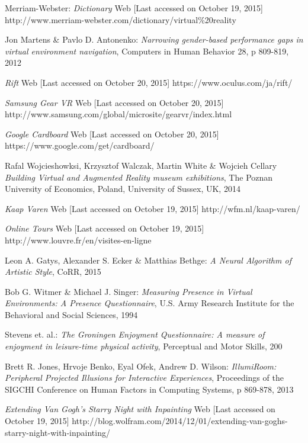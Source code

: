 \documentclass[a4paper]{article}
\begin{document}
\begin{thebibliography}{99}

 Merriam-Webster:
\emph{Dictionary}
Web [Last accessed on October 19, 2015]
http://www.merriam-webster.com/dictionary/virtual\%20reality

 Jon Martens \& Pavlo D. Antonenko:
\emph{Narrowing gender-based performance gaps in virtual environment navigation},
Computers in Human Behavior 28, p 809-819, 2012

\emph{Rift}
Web [Last accessed on October 20, 2015]
https://www.oculus.com/ja/rift/

\emph{Samsung Gear VR}
Web [Last accessed on October 20, 2015]
http://www.samsung.com/global/microsite/gearvr/index.html

\emph{Google Cardboard}
Web [Last accessed on October 20, 2015]
https://www.google.com/get/cardboard/

 Rafal Wojcieshowksi, Krzysztof Walczak, Martin White \& Wojcieh Cellary
\emph{Building Virtual and Augmented Reality museum exhibitions},
The Poznan University of Economics, Poland,
University of Sussex, UK, 2014

\emph{Kaap Varen}
Web [Last accessed on October 19, 2015]
http://wfm.nl/kaap-varen/

\emph{Online Tours}
Web [Last accessed on October 19, 2015]
http://www.louvre.fr/en/visites-en-ligne

 Leon A. Gatys, Alexander S. Ecker \& Matthias Bethge:
\emph{A Neural Algorithm of Artistic Style},
CoRR, 2015

 Bob G. Witmer \& Michael J. Singer:
\emph{Measuring Presence in Virtual Environments: A Presence Questionnaire},
U.S. Army Research Institute for the Behavioral and Social Sciences, 1994

 Stevens et. al.:
\emph{The Groningen Enjoyment Questionnaire: A measure of enjoyment in leisure-time physical activity},
Perceptual and Motor Skills, 200

 Brett R. Jones, Hrvoje Benko, Eyal Ofek, Andrew D. Wilson:
\emph{IllumiRoom: Peripheral Projected Illusions for
Interactive Experiences},
Proceedings of the SIGCHI Conference on Human Factors in Computing Systems, p 869-878, 2013

\emph{Extending Van Gogh’s \emph{Starry Night} with Inpainting}
Web [Last accessed on October 19, 2015]
http://blog.wolfram.com/2014/12/01/extending-van-goghs-starry-night-with-inpainting/

\end{thebibliography}
\end{document}
